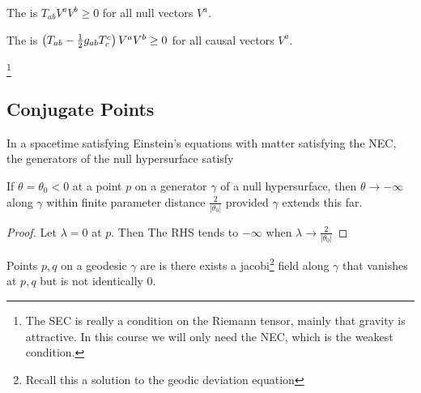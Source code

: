 \documentclass{article}
\begin{document}
\begin{definition}
The  is $T_{ab} V^a V^b \geq 0$ for all null vectors $V^a$. 
\end{definition}

\begin{definition}
The  is $\left( T_{ab} - \frac{1}{2} g_{ab} T^c_c  \right)V^a V^b \geq 0$ for all causal vectors $V^a$. 
\end{definition}

\footnote{The SEC is really a condition on the Riemann tensor, mainly that gravity is attractive. In this course we will only need the NEC, which is the weakest condition.}

\subsection{Conjugate Points}

\begin{lemma}
In a spacetime satisfying Einstein's equations with matter satisfying the NEC, the generators of the null hypersurface satisfy 
\end{lemma}

\begin{corollary}
If $\theta = \theta_0 < 0$ at a point $p$ on a generator $\gamma$ of a null hypersurface, then $\theta \to -\infty$ along $\gamma$ within finite parameter distance $\frac{2}{|\theta_0|}$ provided $\gamma$ extends this far. 
\end{corollary}
\begin{proof}
Let $\lambda = 0$ at $p$. Then 
The RHS tends to $-\infty$ when $\lambda \to \frac{2}{|\theta_0|}$
\end{proof}

\begin{definition}
Points $p,q$ on a geodesic $\gamma$ are  is there exists a jacobi\footnote{Recall this a solution to the geodic deviation equation} field along $\gamma$ that vanishes at $p,q$ but is not identically 0. 
\end{definition}
\end{document}

